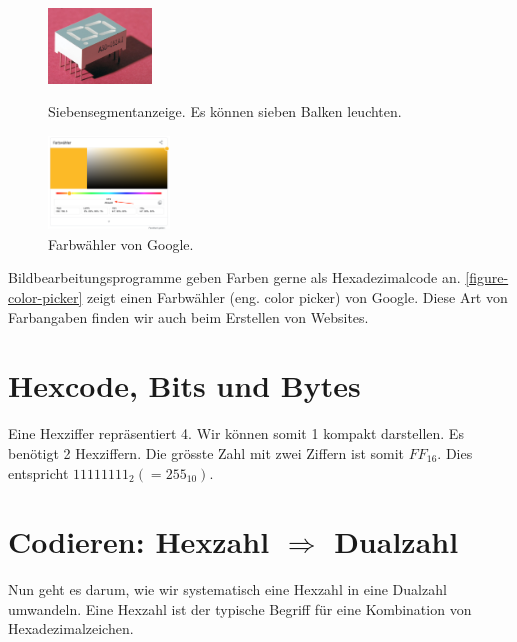 \begin{figure}[htb]
\centering
\begin{minipage}{0.45\textwidth}
\centering
\includegraphics[height=2cm]{siebensegmentanzeige}
\caption{Siebensegmentanzeige. Es können sieben Balken leuchten.}
\label{figure-siebensegmentanzeige}
\end{minipage}
\hfill
\begin{minipage}{0.45\textwidth}
\centering
\includegraphics[height=2.5cm]{color_picker}
\caption{Farbwähler von Google.}
\label{figure-color-picker}
\end{minipage}
\end{figure}

\begin{example}[Farbauswahl]
Bildbearbeitungsprogramme geben Farben gerne als Hexadezimalcode an. \autoref{figure-color-picker} zeigt einen Farbwähler (eng. color picker) von Google. Diese Art von Farbangaben finden wir auch beim Erstellen von Websites.
\end{example}

\section{Hexcode, Bits und Bytes}

Eine Hexziffer repräsentiert \qty{4}{\bit}. Wir können somit \qty{1}{\byte} kompakt darstellen. Es benötigt \num{2} Hexziffern. Die grösste Zahl mit zwei Ziffern ist somit $FF_{16}$. Dies entspricht $11111111_2 (= 255_{10})$.

\section{Codieren: Hexzahl $\Rightarrow$ Dualzahl}

Nun geht es darum, wie wir systematisch eine Hexzahl in eine Dualzahl umwandeln. Eine Hexzahl ist der typische Begriff für eine Kombination von Hexadezimalzeichen.

